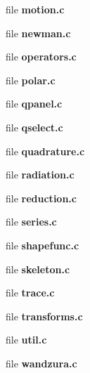 \begin{DoxyCompactItemize}
\item 
file {\bfseries motion.\+c}
\item 
file {\bfseries newman.\+c}
\item 
file {\bfseries operators.\+c}
\item 
file {\bfseries polar.\+c}
\item 
file {\bfseries qpanel.\+c}
\item 
file {\bfseries qselect.\+c}
\item 
file {\bfseries quadrature.\+c}
\item 
file {\bfseries radiation.\+c}
\item 
file {\bfseries reduction.\+c}
\item 
file {\bfseries series.\+c}
\item 
file {\bfseries shapefunc.\+c}
\item 
file {\bfseries skeleton.\+c}
\item 
file {\bfseries trace.\+c}
\item 
file {\bfseries transforms.\+c}
\item 
file {\bfseries util.\+c}
\item 
file {\bfseries wandzura.\+c}
\end{DoxyCompactItemize}
